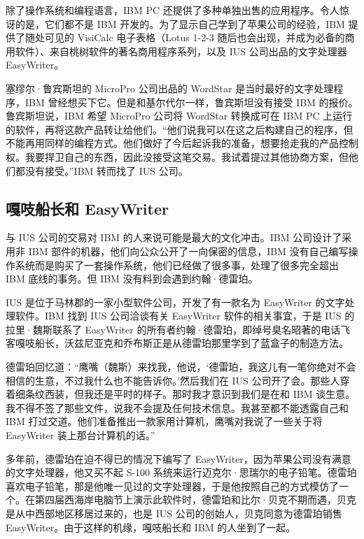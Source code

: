 \documentclass[12pt,UTF8]{ctexbook}
\begin{document}
除了操作系统和编程语言，IBM PC 还提供了多种单独出售的应用程序。令人惊讶的是，它们都不是 IBM 开发的。为了显示自己学到了苹果公司的经验，IBM 提供了随处可见的 VisiCalc 电子表格（Lotus 1-2-3 随后也会出现，并成为必备的商用软件）、来自桃树软件的著名商用程序系列，以及 IUS 公司出品的文字处理器 EasyWriter。

塞缪尔·鲁宾斯坦的 MicroPro 公司出品的 WordStar 是当时最好的文字处理程序，IBM 曾经想买下它。但是和基尔代尔一样，鲁宾斯坦没有接受 IBM 的报价。鲁宾斯坦说，IBM 希望 MicroPro 公司将 WordStar 转换成可在 IBM PC 上运行的软件，再将这款产品转让给他们。“他们说我可以在这之后构建自己的程序，但不能再用同样的编程方式。他们做好了今后起诉我的准备，想要抢走我的产品控制权。我要捍卫自己的东西，因此没接受这笔交易。我试着提过其他协商方案，但他们都没有接受。”IBM 转而找了 IUS 公司。





\subsection{嘎吱船长和 EasyWriter}


与 IUS 公司的交易对 IBM 的人来说可能是最大的文化冲击。IBM 公司设计了采用非 IBM 部件的机器，他们向公众公开了一向保密的信息，IBM 没有自己编写操作系统而是购买了一套操作系统，他们已经做了很多事，处理了很多完全超出 IBM 底线的事务。但 IBM 没有料到会遇到约翰·德雷珀。

IUS 是位于马林郡的一家小型软件公司，开发了有一款名为 EasyWriter 的文字处理软件。IBM 找到 IUS 公司洽谈有关 EasyWriter 软件的相关事宜，于是 IUS 的拉里·魏斯联系了 EasyWriter 的所有者约翰·德雷珀，即绰号臭名昭著的电话飞客嘎吱船长，沃兹尼亚克和乔布斯正是从德雷珀那里学到了蓝盒子的制造方法。

德雷珀回忆道：“鹰嘴（魏斯）来找我，他说，‘德雷珀，我这儿有一笔你绝对不会相信的生意，不过我什么也不能告诉你。’然后我们在 IUS 公司开了会。那些人穿着细条纹西装，但我还是平时的样子。那时我才意识到我们是在和 IBM 谈生意。我不得不签了那些文件，说我不会提及任何技术信息。我甚至都不能透露自己和 IBM 打过交道。他们准备推出一款家用计算机，鹰嘴对我说了一些关于将 EasyWriter 装上那台计算机的话。”

多年前，德雷珀在迫不得已的情况下编写了 EasyWriter，因为苹果公司没有满意的文字处理器，他又买不起 S-100 系统来运行迈克尔·思瑞尔的电子铅笔。德雷珀喜欢电子铅笔，那是他唯一见过的文字处理器，于是他按照自己的方式模仿了一个。在第四届西海岸电脑节上演示此软件时，德雷珀和比尔·贝克不期而遇，贝克是从中西部地区移居过来的，也是 IUS 公司的创始人，贝克同意为德雷珀销售 EasyWriter。由于这样的机缘，嘎吱船长和 IBM 的人坐到了一起。
\end{document}
